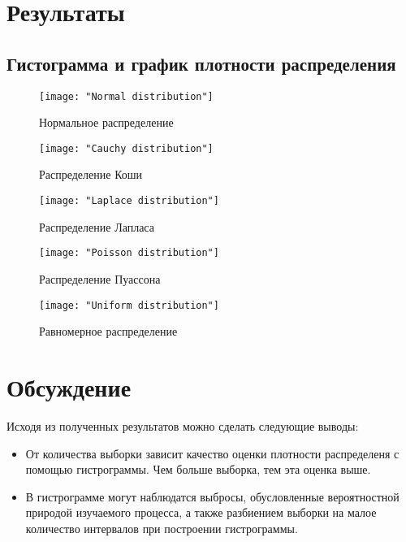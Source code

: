 \documentclass[12pt,a4paper]{article}
\begin{document}
\section{Результаты}
	\subsection{Гистограмма и график плотности распределения}
	\begin{center}
		\begin{figure}[h!]
			\texttt{[image: "Normal distribution"]} 
			\caption[Нормальное распределение]{Нормальное распределение}
		\end{figure}
		
		\begin{figure}[h!]
			\texttt{[image: "Cauchy distribution"]}
			\caption[Распределение Коши]{Распределение Коши}
		\end{figure}
		
		\begin{figure}[h!]
			\texttt{[image: "Laplace distribution"]}
			\caption[Распределение Лапласа]{Распределение Лапласа}
		\end{figure}
		
		\begin{figure}[h!]
			\texttt{[image: "Poisson distribution"]}
			\caption[Распределение Пуассона]{Распределение Пуассона}
		\end{figure}
	
		\begin{figure}[h!]
			\texttt{[image: "Uniform distribution"]}
			\caption[Равномерное распределение]{Равномерное распределение}
		\end{figure}
	\end{center}

\newpage
\section{Обсуждение}
	Исходя из полученных результатов можно сделать следующие выводы:
	\begin{itemize}
		\item От количества выборки зависит качество оценки плотности распределеня с помощью гистрограммы. Чем больше выборка, тем эта оценка выше.
		\item В гистрограмме могут наблюдатся выбросы, обусловленные вероятностной природой изучаемого процесса, а также разбиением выборки на малое количество интервалов при построении гистрограммы.
	\end{itemize}
\end{document}
